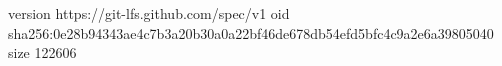 version https://git-lfs.github.com/spec/v1
oid sha256:0e28b94343ae4c7b3a20b30a0a22bf46de678db54efd5bfc4c9a2e6a39805040
size 122606
